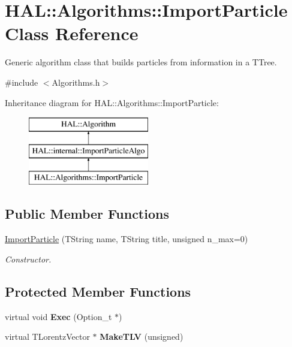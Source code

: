 \hypertarget{class_h_a_l_1_1_algorithms_1_1_import_particle}{\section{H\-A\-L\-:\-:Algorithms\-:\-:Import\-Particle Class Reference}
\label{class_h_a_l_1_1_algorithms_1_1_import_particle}
}


Generic algorithm class that builds particles from information in a T\-Tree.  




{\ttfamily \#include $<$Algorithms.\-h$>$}

Inheritance diagram for H\-A\-L\-:\-:Algorithms\-:\-:Import\-Particle\-:\begin{figure}[H]
\begin{center}
\leavevmode
\includegraphics[height=3.000000cm]{class_h_a_l_1_1_algorithms_1_1_import_particle}
\end{center}
\end{figure}
\subsection*{Public Member Functions}
\begin{DoxyCompactItemize}
\item 
\hyperlink{class_h_a_l_1_1_algorithms_1_1_import_particle_ab42dcac49ed8ae1f565346ec7372c7a5}{Import\-Particle} (T\-String name, T\-String title, unsigned n\-\_\-max=0)
\begin{DoxyCompactList}\small\item\em Constructor. \end{DoxyCompactList}\end{DoxyCompactItemize}
\subsection*{Protected Member Functions}
\begin{DoxyCompactItemize}
\item 
\hypertarget{class_h_a_l_1_1_algorithms_1_1_import_particle_a1e5924b9deb6c7d1c1d1734b8cb510cb}{virtual void {\bfseries Exec} (Option\-\_\-t $\ast$)}\label{class_h_a_l_1_1_algorithms_1_1_import_particle_a1e5924b9deb6c7d1c1d1734b8cb510cb}

\item 
\hypertarget{class_h_a_l_1_1_algorithms_1_1_import_particle_abad1a5a9b44becfae4e4a7113edc80eb}{virtual T\-Lorentz\-Vector $\ast$ {\bfseries Make\-T\-L\-V} (unsigned)}\label{class_h_a_l_1_1_algorithms_1_1_import_particle_abad1a5a9b44becfae4e4a7113edc80eb}

\end{DoxyCompactItemize}
